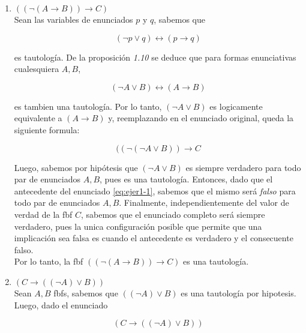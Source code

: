 \documentclass[osajnl,twocolumn,showpacs,superscriptaddress,10pt]{revtex4-1} %
\begin{document}
\begin{enumerate}[i-]
  \item $((\neg (A \rightarrow B)) \rightarrow C)$ \\

  Sean las variables de enunciados $p$ y $q$, sabemos que

  \begin{equation}
    (\neg p \vee q) \leftrightarrow (p \rightarrow q)
  \end{equation}

  es tautología. De la proposición \textit{1.10} se deduce que para formas enunciativas cualesquiera $A, B$,\

  \begin{equation}
    (\neg A \vee B) \leftrightarrow (A \rightarrow B)
  \end{equation}

  es tambien una tautología. Por lo tanto, $(\neg A \vee B)$ es logicamente equivalente a $(A \rightarrow B)$ y, reemplazando en el enunciado original, queda la siguiente formula:

  \begin{equation}
    ((\neg (\neg A \vee B)) \rightarrow C
    \label{eq:ejer1-1}
  \end{equation}

  Luego, sabemos por hipótesis que $(\neg A \vee B)$ es siempre verdadero para todo par de enunciados $A, B$, pues es una tautología. Entonces, dado que el antecedente del enunciado \ref{eq:ejer1-1}, sabemos que el mismo será \textit{falso} para todo par de enunciados $A, B$. Finalmente, independientemente del valor de verdad de la fbf $C$, sabemos que el enunciado completo será siempre verdadero, pues la unica configuración posible que permite que una implicación sea falsa es cuando el antecedente es verdadero y el consecuente falso. \\

  Por lo tanto, la fbf $((\neg (A \rightarrow B)) \rightarrow C)$ es una tautología. \\

  \item $(C \rightarrow ((\neg A) \vee B))$ \\

  Sean $A, B$ fbfs, sabemos que $((\neg A) \vee B)$ es una tautología por hipotesis. Luego, dado el enunciado

  \begin{equation}
    (C \rightarrow ((\neg A) \vee B))
  \end{equation}


\end{enumerate}
\end{document}
